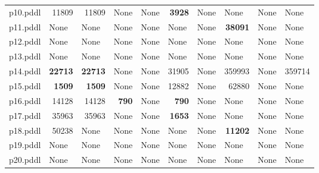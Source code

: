 \documentclass{article}
\begin{document}
\begin{tabular}{@{}lrrrrrrrrr@{}}
p10.pddl & 11809 & 11809 & \multicolumn{1}{|l|}{None} & \multicolumn{1}{|l|}{None} & \textbf{3928} & \multicolumn{1}{|l|}{None} & \multicolumn{1}{|l|}{None} & \multicolumn{1}{|l|}{None} & \multicolumn{1}{|l|}{None} \\
p11.pddl & \multicolumn{1}{|l|}{None} & \multicolumn{1}{|l|}{None} & \multicolumn{1}{|l|}{None} & \multicolumn{1}{|l|}{None} & \multicolumn{1}{|l|}{None} & \multicolumn{1}{|l|}{None} & \textbf{38091} & \multicolumn{1}{|l|}{None} & \multicolumn{1}{|l|}{None} \\
p12.pddl & \multicolumn{1}{|l|}{None} & \multicolumn{1}{|l|}{None} & \multicolumn{1}{|l|}{None} & \multicolumn{1}{|l|}{None} & \multicolumn{1}{|l|}{None} & \multicolumn{1}{|l|}{None} & \multicolumn{1}{|l|}{None} & \multicolumn{1}{|l|}{None} & \multicolumn{1}{|l|}{None} \\
p13.pddl & \multicolumn{1}{|l|}{None} & \multicolumn{1}{|l|}{None} & \multicolumn{1}{|l|}{None} & \multicolumn{1}{|l|}{None} & \multicolumn{1}{|l|}{None} & \multicolumn{1}{|l|}{None} & \multicolumn{1}{|l|}{None} & \multicolumn{1}{|l|}{None} & \multicolumn{1}{|l|}{None} \\
p14.pddl & \textbf{22713} & \textbf{22713} & \multicolumn{1}{|l|}{None} & \multicolumn{1}{|l|}{None} & 31905 & \multicolumn{1}{|l|}{None} & 359993 & \multicolumn{1}{|l|}{None} & 359714 \\
p15.pddl & \textbf{1509} & \textbf{1509} & \multicolumn{1}{|l|}{None} & \multicolumn{1}{|l|}{None} & 12882 & \multicolumn{1}{|l|}{None} & 62880 & \multicolumn{1}{|l|}{None} & \multicolumn{1}{|l|}{None} \\
p16.pddl & 14128 & 14128 & \textbf{790} & \multicolumn{1}{|l|}{None} & \textbf{790} & \multicolumn{1}{|l|}{None} & \multicolumn{1}{|l|}{None} & \multicolumn{1}{|l|}{None} & \multicolumn{1}{|l|}{None} \\
p17.pddl & 35963 & 35963 & \multicolumn{1}{|l|}{None} & \multicolumn{1}{|l|}{None} & \textbf{1653} & \multicolumn{1}{|l|}{None} & \multicolumn{1}{|l|}{None} & \multicolumn{1}{|l|}{None} & \multicolumn{1}{|l|}{None} \\
p18.pddl & 50238 & \multicolumn{1}{|l|}{None} & \multicolumn{1}{|l|}{None} & \multicolumn{1}{|l|}{None} & \multicolumn{1}{|l|}{None} & \multicolumn{1}{|l|}{None} & \textbf{11202} & \multicolumn{1}{|l|}{None} & \multicolumn{1}{|l|}{None} \\
p19.pddl & \multicolumn{1}{|l|}{None} & \multicolumn{1}{|l|}{None} & \multicolumn{1}{|l|}{None} & \multicolumn{1}{|l|}{None} & \multicolumn{1}{|l|}{None} & \multicolumn{1}{|l|}{None} & \multicolumn{1}{|l|}{None} & \multicolumn{1}{|l|}{None} & \multicolumn{1}{|l|}{None} \\
p20.pddl & \multicolumn{1}{|l|}{None} & \multicolumn{1}{|l|}{None} & \multicolumn{1}{|l|}{None} & \multicolumn{1}{|l|}{None} & \multicolumn{1}{|l|}{None} & \multicolumn{1}{|l|}{None} & \multicolumn{1}{|l|}{None} & \multicolumn{1}{|l|}{None} & \multicolumn{1}{|l|}{None} \\
\end{tabular}
\end{document}
